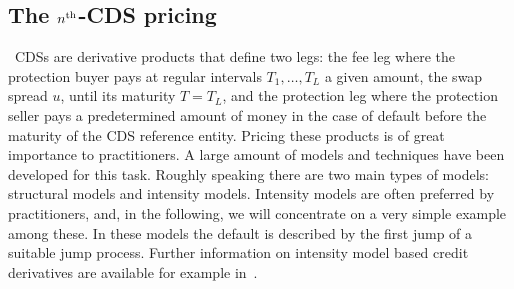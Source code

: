 \documentclass[a4paper,11pt]{amsart}
\theoremstyle{remark}
\newcommand{\nth}{n\textsuperscript{th}}
\begin{document}
 \subsection{The $\nth$-CDS pricing}
 \
 CDSs are derivative products that define two legs: the fee leg where the protection buyer pays at regular intervals $T_1,\ldots,T_L$ a given amount, the swap spread $u$, until its maturity $T=T_L$, and the protection leg where the protection seller pays a predetermined amount of money in the case of default before the maturity of the CDS reference entity. Pricing these products is of great importance to practitioners. A large amount of models and techniques have been developed for this task. Roughly speaking there are two main types of models: structural models and intensity models. Intensity models are often preferred by practitioners, and, in the following, we will concentrate on a very simple example among these. In these models the default is described by the first jump of a suitable jump process. Further information on intensity model based credit derivatives are available for example in~\cite{brigo_interest_2006}.\\
\end{document}
